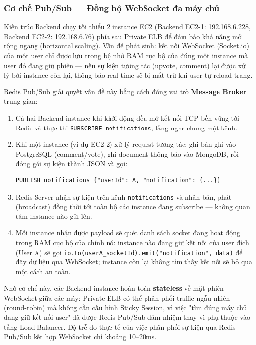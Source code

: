 \documentclass[12pt, a4paper]{article}
\begin{document}
\subsubsection{Cơ chế Pub/Sub — Đồng bộ WebSocket đa máy chủ}
Kiến trúc Backend chạy tối thiểu 2 instance EC2 (Backend EC2-1: 192.168.6.228, Backend EC2-2: 192.168.6.76) phía sau Private ELB để đảm bảo khả năng mở rộng ngang (horizontal scaling).
Vấn đề phát sinh: kết nối WebSocket (Socket.io) của một user chỉ được lưu trong bộ nhớ RAM cục bộ của đúng một instance mà user đó đang giữ phiên — nếu sự kiện tương tác (upvote, comment) lại được xử lý bởi instance còn lại, thông báo real-time sẽ bị mất trừ khi user tự reload trang.

Redis Pub/Sub giải quyết vấn đề này bằng cách đóng vai trò \textbf{Message Broker} trung gian:
\begin{enumerate}
\item Cả hai Backend instance khi khởi động đều mở kết nối TCP bền vững tới Redis và thực thi \texttt{SUBSCRIBE notifications}, lắng nghe chung một kênh.
\item Khi một instance (ví dụ EC2-2) xử lý request tương tác: ghi bản ghi vào PostgreSQL (comment/vote), ghi document thông báo vào MongoDB, rồi đóng gói sự kiện thành JSON và gọi:
\begin{lstlisting}
PUBLISH notifications {"userId": A, "notification": {...}}
\end{lstlisting}
\item Redis Server nhận sự kiện trên kênh \texttt{notifications} và nhân bản, phát (broadcast) đồng thời tới toàn bộ các instance đang subscribe — không quan tâm instance nào gửi lên.
\item Mỗi instance nhận được payload sẽ quét danh sách socket đang hoạt động trong RAM cục bộ của chính nó: instance nào đang giữ kết nối của user đích (User A) sẽ gọi \texttt{io.to(userA\_socketId).emit(\allowbreak "notification", data)} để đẩy dữ liệu qua WebSocket; instance còn lại không tìm thấy kết nối sẽ bỏ qua một cách an toàn.
\end{enumerate}

Nhờ cơ chế này, các Backend instance hoàn toàn \textbf{stateless} về mặt phiên WebSocket giữa các máy: Private ELB có thể phân phối traffic ngẫu nhiên (round-robin) mà không cần cấu hình Sticky Session, vì việc "tìm đúng máy chủ đang giữ kết nối user" đã được Redis Pub/Sub đảm nhiệm thay vì phụ thuộc vào tầng Load Balancer. Độ trễ đo thực tế của việc phân phối sự kiện qua Redis Pub/Sub kết hợp WebSocket chỉ khoảng 10–20ms.
\end{document}
